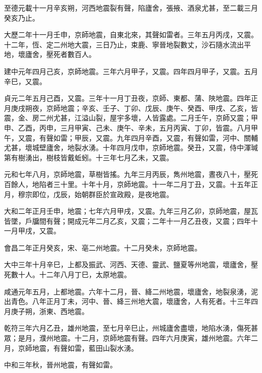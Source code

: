 \begin{pinyinscope}
 至德元載十一月辛亥朔，河西地震裂有聲，陷廬舍，張掖、酒泉尤甚，至二載三月癸亥乃止。



 大歷二年十一月壬申，京師地震，自東北來，其聲如雷者。三年五月丙戌，又震。十二年，恆、定二州地大震，三日乃止，束鹿、寧晉地裂數丈，沙石隨水流出平地，壞廬舍，壓死者數百人。



 建中元年四月己亥，京師地震。三年六月甲子，又震。四年四月甲子，又震。五月辛巳，又震。



 貞元二年五月己酉，又震。三年十一月丁丑夜，京師、東都、蒲、陜地震。四年正月庚戌朔夜，京師地震；辛亥、壬子、丁卯、戊辰、庚午、癸酉、甲戌、乙亥，皆震，金、房二州尤甚，江溢山裂，屋宇多壞，人皆露處。二月壬午，京師又震；甲申、乙酉，丙申，三月甲寅、己未、庚午、辛未，五月丙寅、丁卯，皆震。八月甲午，又震，有聲如雷；甲辰，又震。九年四月辛酉，又震，有聲如雷，河中、關輔尤甚，壞城壁廬舍，地裂水湧。十年四月戊申，京師地震。癸丑，又震，侍中渾瑊第有樹湧出，樹枝皆戴蚯蚓。十三年七月乙未，又震。



 元和七年八月，京師地震，草樹皆搖。九年三月丙辰，雋州地震，晝夜八十，壓死百餘人，地陷者三十里。十年十月，京師地震。十一年二月丁丑，又震。十五年正月，穆宗即位，戊辰，始朝群臣於宣政殿，是夜地震。



 大和二年正月壬申，地震；七年六月甲戌，又震。九年三月乙卯，京師地震，屋瓦皆墜，戶牖間有聲；開成元年二月乙亥，又震；二年十一月乙丑夜，又震；四年十一月甲戌，又震。



 會昌二年正月癸亥，宋、亳二州地震。十二月癸未，京師地震。



 大中三年十月辛巳，上都及振武、河西、天德、靈武、鹽夏等州地震，壞廬舍，壓死數十人。十二年八月丁巳，太原地震。



 咸通元年五月，上都地震。六年十二月，晉、絳二州地震，壞廬舍，地裂泉湧，泥出青色。八年正月丁未，河中、晉、絳三州地大震，壞廬舍，人有死者。十三年四月庚子朔，浙東、西地震。



 乾符三年六月乙丑，雄州地震，至七月辛巳止，州城廬舍盡壞，地陷水湧，傷死甚眾；是月，濮州地震。十二月，京師地震有聲。四年六月庚寅，雄州地震。六年二月，京師地震，有聲如雷，藍田山裂水湧。



 中和三年秋，晉州地震，有聲如雷。




\end{pinyinscope}
